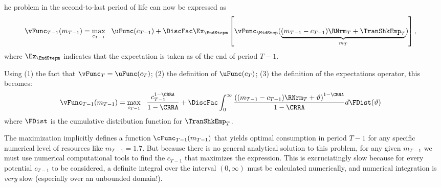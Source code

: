 \documentclass[titlepage, headings=optiontotocandhead]{\econtex}
\newcommand{\vNormedPermGroFac}{\PermGroFac_{\stge}^{1-\CRRA}}
\renewcommand{\vNormedPermGroFac}{}
\begin{document}
\renewcommand{\stge}{T}
he problem in the second-to-last period of life can now be expressed as
\begin{equation*}\begin{gathered}\begin{aligned}
      \null{\vFunc}_{\stge-1}({m}_{\stge-1})  & = \max_{{c}_{\stge-1}} ~~ \uFunc({c}_{\stge-1}) +
      \DiscFac \Ex_{\EndStepm} \left[\vNormedPermGroFac{\vFunc}_{\MidStep}(\underbrace{({m}_{\stge-1}-{c}_{\stge-1})\RNrm_{\stge} + \TranShkEmp_{\stge}}_{{m}_{\stge}})\right],
\end{aligned}\end{gathered}\end{equation*}
where $\Ex_{\EndStepm}$  indicates that the expectation is taken as of the end of period $\stge-1$.

Using (1) the fact that $\vFunc_{T}=\uFunc(c_{T})$; (2) the definition of $\uFunc(c_{T})$; (3) the
definition of the expectations operator, this becomes: \newcommand{\TranShkEmpDummy}{\vartheta}
\begin{equation*}\begin{gathered}\begin{aligned}
      \null{\vFunc}_{T-1}({m}_{T-1})   & = \max_{{c}_{T-1}} ~~
      \frac{{c}_{T-1}^{1-\CRRA}}{1-\CRRA} + \DiscFac \vNormedPermGroFac\int_{0}^{\infty}
      \frac{\left(({m}_{T-1}-{c}_{T-1})\RNrm_{T}+ \TranShkEmpDummy\right)^{1-\CRRA}}{1-\CRRA}
      d\FDist(\TranShkEmpDummy)
    \end{aligned}\end{gathered}\end{equation*}
where $\FDist$ is the cumulative distribution function for ${\TranShkEmp}_{T}$.

The maximization implicitly defines a function $\cFunc_{T-1}({m}_{T-1})$ that yields optimal consumption in period $T-1$ for any specific numerical level of resources like ${m}_{T-1}=1.7$.  But because there is no general analytical solution to this problem, for any given ${m}_{T-1}$ we must use numerical computational tools to find the ${c}_{T-1}$ that maximizes the expression.  This is excruciatingly slow because for every potential ${c}_{T-1}$ to be considered, a definite integral over the interval $(0,\infty)$ must be calculated numerically, and numerical integration is \textit{very} slow (especially over an unbounded domain!).
\end{document}
